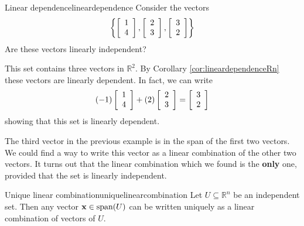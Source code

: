\begin{example}{Linear dependence}{lineardependence}
Consider the vectors 
\[
\left\{ \left[ \begin{array}{r}
1 \\
4 
\end{array}
\right], 
\left[ \begin{array}{r}
2 \\
3
\end{array}
\right], 
\left[ \begin{array}{r}
3 \\
2
\end{array}
\right] \right\}
\]
Are these vectors linearly independent?
\end{example}

\begin{solution}
This set contains three vectors in $\mathbb{R}^2$. By Corollary \ref{cor:lineardependenceRn} these vectors are linearly dependent.
In fact, we can write
\[
(-1) \left[ \begin{array}{r}
1 \\
4 
\end{array}
\right] + (2) 
\left[ \begin{array}{r}
2 \\
3
\end{array}
\right] = 
\left[ \begin{array}{r}
3 \\
2
\end{array}
\right]
\]
showing that this set is linearly dependent. 
\end{solution}

The third vector in the previous example is in the span of the first two vectors. We could find a way to write this vector as a linear combination of the other two vectors. It turns out that the linear combination which we found is the \textbf{only} one, provided that the set is linearly independent. 

\begin{theorem}{Unique linear combination}{uniquelinearcombination}
Let $U \subseteq\mathbb{R}^n$ be an independent set.
Then any vector ${\bf x}\in\mbox{span}(U)$ can be written uniquely as a linear combination of vectors of $U$.
\end{theorem}

